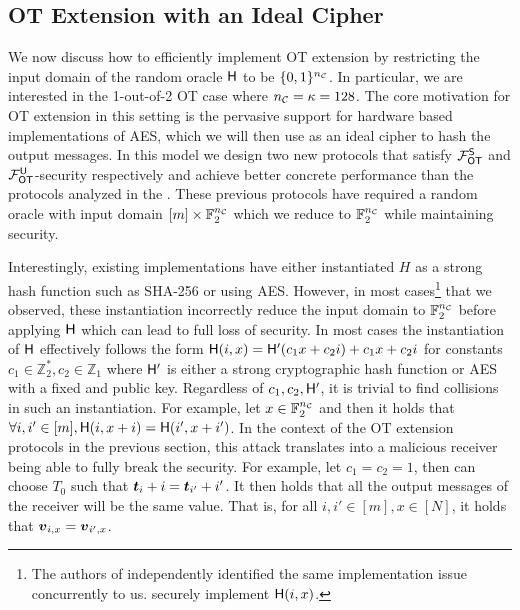 \subsection{OT Extension with an Ideal Cipher}
We now discuss how to efficiently implement OT extension by restricting the input domain of the random oracle $\H$ to be $\{0,1\}^\nc$. In particular, we are interested in the 1-out-of-2 OT case where $\nc=\kappa=128$. The core motivation for OT extension in this setting is the pervasive support for hardware based implementations of AES\cite{aes-ni,aes-neon}, which we will then use as an ideal cipher to hash the output messages. In this model we design two new protocols that satisfy $\OOT^\send$ and $\OOT^\U$-security respectively and achieve better concrete performance than the protocols analyzed in the . These previous protocols have required a random oracle with input domain $[m]\times \mathbb{F}^\nc_2$ which we reduce to $\mathbb{F}^\nc_2$ while maintaining security. 

Interestingly, existing implementations\cite{libOTe,encrypto,KOS,EMP} have either instantiated $H$ as a strong hash function such as SHA-256 or using AES. However, in most cases\footnote{\label{empNote}The authors of \cite{EMP} independently identified the same implementation issue concurrently to us. \cite{EMP} securely implement $\H(i,x)$. } that we observed\cite{libOTe,encrypto,KOS}, these instantiation incorrectly reduce the input domain to $\mathbb{F}^\nc_2$ before applying $\H$ which can lead to full loss of security. In most cases the instantiation of $\H$ effectively follows the form $\H(i,x)=\H'(c_1 x + c_2 i) + c_1 x + c_2 i$ for constants $c_1\in\mathbb{Z}^*_2,c_2\in\mathbb{Z}_1$ where $\H'$ is either a strong cryptographic hash function or AES with a fixed and public key. Regardless of $c_1,c_2,\H'$, it is trivial to find collisions in such an instantiation. For example, let $x\in\mathbb{F}^\nc_2$ and then it holds that $\forall i,i'\in[m], \H(i,x+i)=\H(i', x+i')$. In the context of the OT extension protocols in the previous section, this attack translates into a malicious receiver being able to fully break the security. For example, let $c_1=c_2=1$, then \rec can choose $T_0$ such that $\tt_i+i=\tt_{i'}+i'$. It then holds that all the output messages of the receiver will be the same value.  That is, for all $i,i'\in[m],x\in[N]$, it holds that $\vv_{i,x}=\vv_{i',x}$. 


